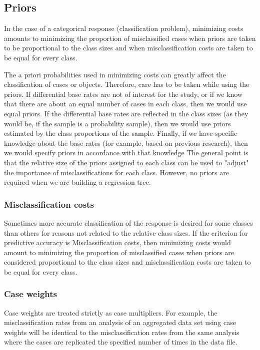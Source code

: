 


\subsection{Priors}In the case of a categorical response (classification problem), minimizing costs amounts to minimizing the proportion of misclassified cases when priors are taken to be proportional to the class sizes and when misclassification costs are taken to be equal for every class.

The a priori probabilities used in minimizing costs can greatly affect the classification of cases or objects. Therefore, care has to be taken while using the priors. If differential base rates are not of interest for the study, or if we know that there are about an equal number of cases in each class, then we would use equal priors. If the differential base rates are reflected in the class sizes (as they would be, if the sample is a probability sample), then we would use priors estimated by the class proportions of the sample.
 Finally, if we have specific knowledge about the base rates (for example, based on previous research), then we would specify priors in accordance with that knowledge The general point is that the relative size of the priors assigned to each class can be used to "adjust" the importance of misclassifications for each class. However, no priors are required when we are building a regression tree.
\subsubsection{Misclassification costs}
Sometimes more accurate classification of the response is desired for some classes than others for reasons not related to the relative class sizes. If the criterion for predictive accuracy is Misclassification costs, then minimizing costs would amount to minimizing the proportion of misclassified cases when priors are considered proportional to the class sizes and misclassification costs are taken to be equal for every class.

\subsubsection{Case weights} Case weights are treated strictly as case multipliers. For example, the misclassification rates from an analysis of an aggregated data set using case weights will be identical to the misclassification rates from the same analysis where the cases are replicated the specified number of times in the data file.

